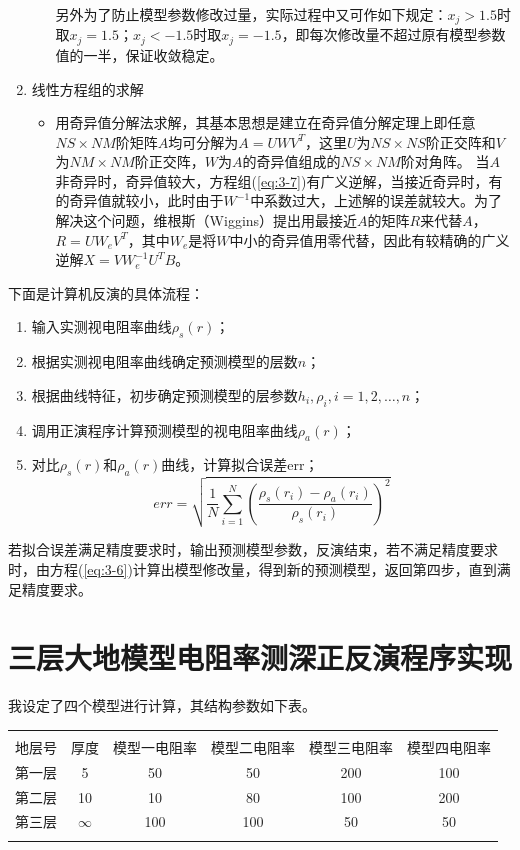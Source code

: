 \documentclass[hyperref,UTF-8,twoside]{ctexart}
\numberwithin{equation}{section}
\begin{document}
\begin{enumerate}
\begin{itemize}
另外为了防止模型参数修改过量，实际过程中又可作如下规定：$x_j>1.5$时取$x_j=1.5$；$x_j<-1.5$时取$x_j=-1.5$，即每次修改量不超过原有模型参数值的一半，保证收敛稳定。
\end{itemize}
\item 线性方程组的求解
\begin{itemize}
\item 用奇异值分解法求解，其基本思想是建立在奇异值分解定理上即任意$NS\times NM$阶矩阵$A$均可分解为$A=UWV^T$，这里$U$为$NS\times NS$阶正交阵和$V$为$NM\times NM$阶正交阵，$W$为$A$的奇异值组成的$NS\times NM$阶对角阵。
当$A$非奇异时，奇异值较大，方程组(\ref{eq:3-7})有广义逆解，当接近奇异时，有的奇异值就较小，此时由于$W^{-1}$中系数过大，上述解的误差就较大。为了解决这个问题，维根斯（Wiggins）提出用最接近$A$的矩阵$R$来代替$A$，$R=UW_{e}V^T$，其中$W_{e}$是将$W$中小的奇异值用零代替，因此有较精确的广义逆解$X=VW_e^{-1}U^{T}B$。
\end{itemize}
\end{enumerate}
下面是计算机反演的具体流程：
\begin{enumerate}
\item 输入实测视电阻率曲线$\rho_s(r)$；
\item 根据实测视电阻率曲线确定预测模型的层数$n$；
\item 根据曲线特征，初步确定预测模型的层参数$h_i,\rho_i,i=1,2,\ldots,n$；
\item 调用正演程序计算预测模型的视电阻率曲线$\rho_a(r)$；
\item 对比$\rho_s(r)$和$\rho_a(r)$曲线，计算拟合误差err；
\begin{equation}
err=\sqrt{\frac{1}{N}\sum_{i=1}^{N}(\frac{\rho_s(r_i)-\rho_a(r_i)}{\rho_s(r_i)})^2}\label{eq:4-9}
\end{equation}
\end{enumerate}
若拟合误差满足精度要求时，输出预测模型参数，反演结束，若不满足精度要求时，由方程(\ref{eq:3-6})计算出模型修改量，得到新的预测模型，返回第四步，直到满足精度要求。
\section{三层大地模型电阻率测深正反演程序实现}
我设定了四个模型进行计算，其结构参数如下表。
\begin{center}
\renewcommand\arraystretch{1}
\begin{tabular}{cccccc}
\Xhline{1.5pt}
\multicolumn{6}{c}{模型结构参数}\\
\Xhline{1.5pt}
地层号&厚度&模型一电阻率&模型二电阻率&模型三电阻率&模型四电阻率\\
第一层&5&50&50&200&100\\
第二层&10&10&80&100&200\\
第三层&$\infty$&100&100&50&50\\
\Xhline{1.5pt}
\end{tabular}
\end{center}
\end{document}

